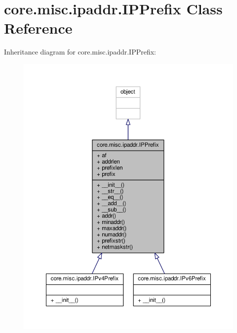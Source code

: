 \hypertarget{classcore_1_1misc_1_1ipaddr_1_1_i_p_prefix}{\section{core.\+misc.\+ipaddr.\+I\+P\+Prefix Class Reference}
\label{classcore_1_1misc_1_1ipaddr_1_1_i_p_prefix}
}


Inheritance diagram for core.\+misc.\+ipaddr.\+I\+P\+Prefix\+:
\nopagebreak
\begin{figure}[H]
\begin{center}
\leavevmode
\includegraphics[width=350pt]{classcore_1_1misc_1_1ipaddr_1_1_i_p_prefix__inherit__graph}
\end{center}
\end{figure}


